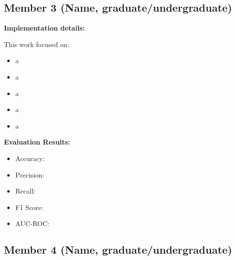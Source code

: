 \documentclass[11pt,a4paper]{article}
\begin{document}
\subsection{Member 3 (Name, graduate/undergraduate)}

\begin{tcolorbox}[
        title=Data Preprocessing and Feature Engineering,
        colback=lightgreen!30,
        colframe=darkgreen,
        boxrule=0.5pt,
        fonttitle=\bfseries\sffamily\footnotesize,
        fontupper=\footnotesize
    ]
    \textbf{Implementation details:}

    This work focused on:
    \begin{itemize}[leftmargin=*, itemsep=2pt, parsep=0pt]
        \item a
        \item a
        \item a
        \item a
        \item a
    \end{itemize}

    \textbf{Evaluation Results:}
    \begin{itemize}[leftmargin=*, itemsep=2pt, parsep=0pt]
        \item Accuracy:
        \item Precision:
        \item Recall:
        \item F1 Score:
        \item AUC-ROC:
    \end{itemize}
\end{tcolorbox}

\subsection{Member 4 (Name, graduate/undergraduate)}
\end{document}
